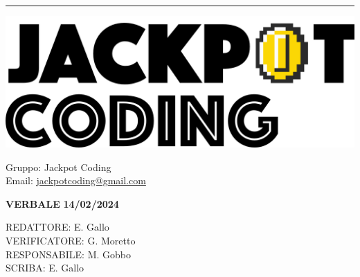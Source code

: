 \documentclass[5pt]{article}
\begin{document}
\hrule
\begin{minipage}[t]{0.50\textwidth}
    \begin{flushleft}
        \hspace{10pt}
        \includegraphics[scale=0.65]{jackpot-logo.png} 
    \end{flushleft}
\end{minipage}
\hspace{-60pt} %
\begin{flushright}
    \begin{minipage}[t]{0.50\textwidth}
        \begin{flushright}
            Gruppo: {\Large Jackpot Coding}\\
            Email: \href{mailto:jackpotcoding@gmail.com}{jackpotcoding@gmail.com}
        \end{flushright}
    \end{minipage}
\end{flushright}

\vspace{15pt}

\begin{center}
    \textbf{\large VERBALE }
    \textbf{\large 14/02/2024} \\
    \textbf{\Large}
\end{center}

\vspace{13pt}

\begin{flushleft}
    \begin{spacing}{1.5}
        REDATTORE:  E. Gallo \\
        VERIFICATORE:  G. Moretto \\%
        RESPONSABILE:  M. Gobbo\\%
        \vspace{7pt}
        SCRIBA: E. Gallo\\%
    \end{spacing}
\end{flushleft}
\end{document}
